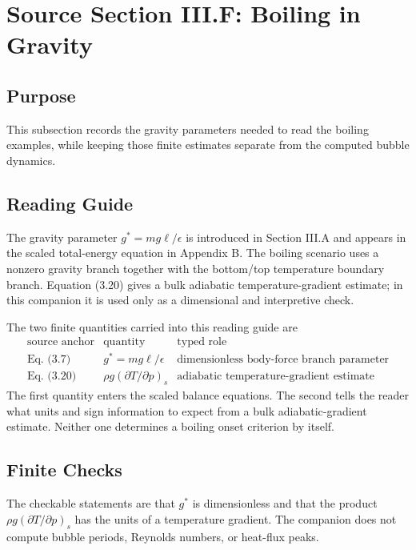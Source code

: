 \section{Source Section III.F: Boiling in Gravity}
\label{sec:boiling-gravity}


\subsection*{Purpose}

This subsection records the gravity parameters needed to read the boiling
examples, while keeping those finite estimates separate from the computed bubble
dynamics.

\subsection*{Reading Guide}

The gravity parameter \(g^*=mg\ell/\epsilon\) is introduced in Section III.A and
appears in the scaled total-energy equation in Appendix B.  The boiling scenario
uses a nonzero gravity branch together with the bottom/top temperature boundary
branch.  Equation (3.20) gives a bulk adiabatic temperature-gradient estimate;
in this companion it is used only as a dimensional and interpretive check.

The two finite quantities carried into this reading guide are
\[
\begin{array}{c|c|c}
\text{source anchor} & \text{quantity} & \text{typed role} \\
\hline
\text{Eq. (3.7)} & g^*=mg\ell/\epsilon
  & \text{dimensionless body-force branch parameter} \\
\text{Eq. (3.20)} &
  \rho g\left(\partial T/\partial p\right)_s
  & \text{adiabatic temperature-gradient estimate}
\end{array}
\]
The first quantity enters the scaled balance equations.  The second tells the
reader what units and sign information to expect from a bulk adiabatic-gradient
estimate.  Neither one determines a boiling onset criterion by itself.

\subsection*{Finite Checks}

The checkable statements are that \(g^*\) is dimensionless and that the product
\(\rho g(\partial T/\partial p)_s\) has the units of a temperature gradient.
The companion does not compute bubble periods, Reynolds numbers, or heat-flux
peaks.


